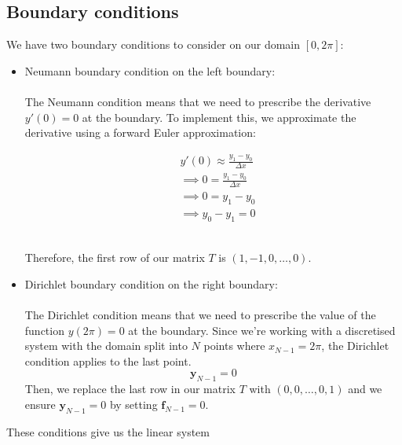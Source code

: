 \documentclass[../main.tex]{subfiles}
\begin{document}
    \subsection*{Boundary conditions}\label{subsec:bvp-boundary-conditions}
    We have two boundary conditions to consider on our domain $[0, 2\pi]$:
    \begin{itemize}
        \item Neumann boundary condition on the left boundary: \\ \\
        The Neumann condition means that we need to prescribe the derivative $y'(0) = 0$ at the boundary.
        To implement this, we approximate the derivative using a forward Euler approximation:
        \begin{center*}
            \begin{align*}
                & y'(0) \approx \frac{y_{1} - y_{0}}{\Delta x} \\
                & \implies 0 = \frac{y_{1} - y_{0}}{\Delta x} \\
                & \implies 0 = y_{1} - y_{0} \\
                & \implies y_{0} - y_{1} = 0
            \end{align*}
        \end{center*}\\
        Therefore, the first row of our matrix $T$ is $(1, -1, 0, \dots, 0)$.
        \item Dirichlet boundary condition on the right boundary: \\ \\
        The Dirichlet condition means that we need to prescribe the value of the function $y(2\pi) = 0$ at the boundary.
        Since we're working with a discretised system with the domain split into $N$ points where $x_{N - 1} = 2\pi$,
        the Dirichlet condition applies to the last point.
        \[
            \mathbf{y}_{N - 1} = 0
        \]
        Then, we replace the last row in our matrix $T$ with $(0, 0, \dots, 0, 1)$ and we ensure $\mathbf{y}_{N - 1} = 0$
        by setting $\mathbf{f}_{N - 1} = 0$.
    \end{itemize}
    These conditions give us the linear system
\end{document}
